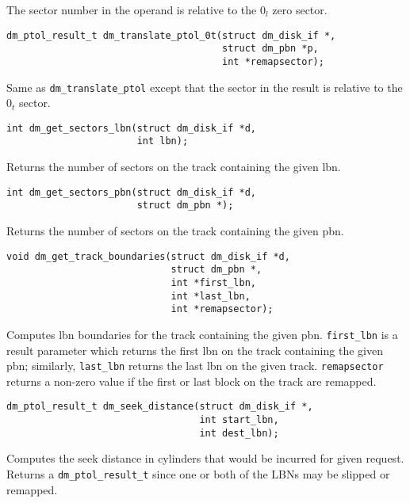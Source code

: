 The sector number in the operand is relative to the $0_l$ zero sector.

\begin{verbatim}
dm_ptol_result_t dm_translate_ptol_0t(struct dm_disk_if *, 
                                      struct dm_pbn *p,
                                      int *remapsector);
\end{verbatim}

Same as \texttt{dm\_translate\_ptol} except that the sector in the result
is relative to the $0_t$ sector.



\begin{verbatim}
int dm_get_sectors_lbn(struct dm_disk_if *d,
                       int lbn);
\end{verbatim}

Returns the number of sectors on the track containing the given lbn.


\begin{verbatim}
int dm_get_sectors_pbn(struct dm_disk_if *d,
                       struct dm_pbn *);
\end{verbatim}

Returns the number of sectors on the track containing the given pbn.


\begin{verbatim}
void dm_get_track_boundaries(struct dm_disk_if *d,
                             struct dm_pbn *,
                             int *first_lbn,
                             int *last_lbn,
                             int *remapsector);
\end{verbatim}

Computes lbn boundaries for the track containing the given pbn.
\texttt{first\_lbn} is a result parameter which returns the first lbn
on the track containing the given pbn; similarly, \texttt{last\_lbn}
returns the last lbn on the given track.  \texttt{remapsector} returns
a non-zero value if the first or last block on the track are remapped.



\begin{verbatim}
dm_ptol_result_t dm_seek_distance(struct dm_disk_if *,
                                  int start_lbn,
                                  int dest_lbn);
\end{verbatim}

Computes the seek distance in cylinders that would be incurred for
given request.  Returns a \texttt{dm\_ptol\_result\_t} since one or both of the
LBNs may be slipped or remapped.


